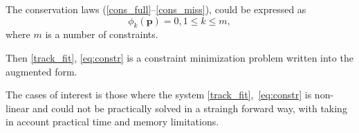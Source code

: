 %


The conservation laws (\ref{cons_full}--\ref{cons_miss}), could be expressed as
\begin{equation}
\label{eq:constr}
\phi_k(\boldsymbol{p}) = 0, 1 \leqslant k  \leqslant m,
\end{equation}
where $m$ is a number of constraints.

Then \eqref{track_fit}, \eqref{eq:constr} is a constraint minimization problem written into the augmented form.

The cases of interest is those where the system \eqref{track_fit},~\eqref{eq:constr} is non-linear and could not be practically solved in a straingh forward way, with taking in account practical time and memory limitations. %

